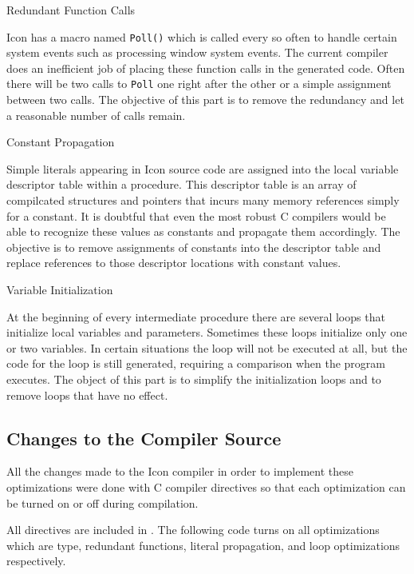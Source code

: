 {\sffamily Redundant Function Calls}

Icon has a macro named \texttt{Poll()} which is called every so often
to handle certain system events such as processing window system
events. The current compiler does an inefficient job of placing these
function calls in the generated code. Often there will be two calls to
\texttt{Poll} one right after the other or a simple assignment between
two calls. The objective of this part is to remove the redundancy and
let a reasonable number of calls remain.

{\sffamily Constant Propagation}

Simple literals appearing in Icon source code are assigned into the
local variable descriptor table within a procedure. This descriptor
table is an array of compilcated structures and pointers that incurs
many memory references simply for a constant. It is doubtful that
even the most robust C compilers would be able to recognize these
values as constants and propagate them accordingly. The objective is
to remove assignments of constants into the descriptor table and
replace references to those descriptor locations with constant values.

{\sffamily Variable Initialization}

At the beginning of every intermediate procedure there are several
loops that initialize local variables and parameters.  Sometimes these
loops initialize only one or two variables. In certain situations the
loop will not be executed at all, but the code for the loop is still
generated, requiring a comparison when the program executes. The
object of this part is to simplify the initialization loops and to
remove loops that have no effect.

\subsection{Changes to the Compiler Source}

All the changes made to the Icon compiler in order to implement these
optimizations were done with C compiler directives so that each
optimization can be turned on or off during compilation.

All directives are included in . The following
code turns on all optimizations which are type, redundant functions,
literal propagation, and loop optimizations respectively.

